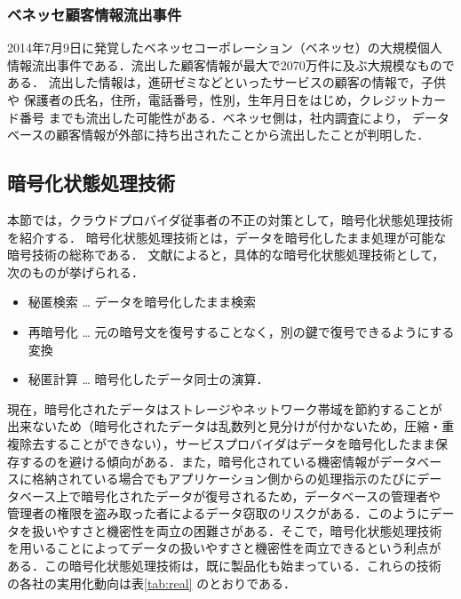 \subsubsection{ベネッセ顧客情報流出事件}
2014年7月9日に発覚したベネッセコーポレーション（ベネッセ）の大規模個人
情報流出事件である．流出した顧客情報が最大で2070万件に及ぶ大規模なものである．
流出した情報は，進研ゼミなどといったサービスの顧客の情報で，子供や
保護者の氏名，住所，電話番号，性別，生年月日をはじめ，クレジットカード番号
までも流出した可能性がある．ベネッセ側は，社内調査により，
データベースの顧客情報が外部に持ち出されたことから流出したことが判明した．



\subsection{暗号化状態処理技術}
本節では，クラウドプロバイダ従事者の不正の対策として，暗号化状態処理技術を紹介する．
暗号化状態処理技術とは，データを暗号化したまま処理が可能な暗号技術の総称である．
文献\cite{sym}によると，具体的な暗号化状態処理技術として，次のものが挙げられる．

\begin{itemize}
\item 秘匿検索 … データを暗号化したまま検索
\item 再暗号化 … 元の暗号文を復号することなく，別の鍵で復号できるようにする変換
\item 秘匿計算 … 暗号化したデータ同士の演算．
\end{itemize}

現在，暗号化されたデータはストレージやネットワーク帯域を節約することが
出来ないため（暗号化されたデータは乱数列と見分けが付かないため，圧縮・重
複除去することができない），サービスプロバイダはデータを暗号化したまま保
存するのを避ける傾向がある．また，暗号化されている機密情報がデータベー
スに格納されている場合でもアプリケーション側からの処理指示のたびにデー
タベース上で暗号化されたデータが復号されるため，データベースの管理者や
管理者の権限を盗み取った者によるデータ窃取のリスクがある．このようにデー
タを扱いやすさと機密性を両立の困難さがある．そこで，暗号化状態処理技術
を用いることによってデータの扱いやすさと機密性を両立できるという利点が
ある．この暗号化状態処理技術は，既に製品化も始まっている．これらの技術
の各社の実用化動向は表\ref{tab:real} のとおりである．

